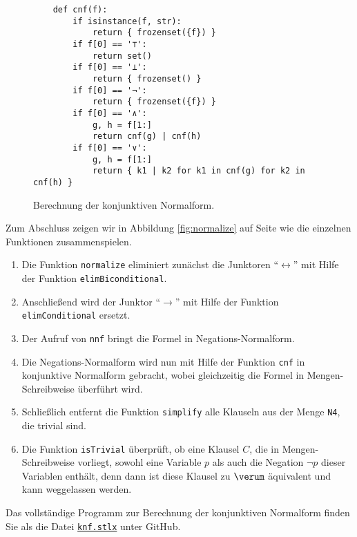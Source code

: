 \begin{figure}[!ht]
  \centering
\begin{verbatim}
    def cnf(f):
        if isinstance(f, str): 
            return { frozenset({f}) }
        if f[0] == '⊤':
            return set()
        if f[0] == '⊥':
            return { frozenset() }
        if f[0] == '¬':
            return { frozenset({f}) }
        if f[0] == '∧':
            g, h = f[1:]
            return cnf(g) | cnf(h)
        if f[0] == '∨':
            g, h = f[1:]
            return { k1 | k2 for k1 in cnf(g) for k2 in cnf(h) }
\end{verbatim}
\vspace*{-0.3cm}
  \caption{Berechnung der konjunktiven Normalform. }
  \label{fig:cnf}
\end{figure}

Zum Abschluss zeigen wir in Abbildung \ref{fig:normalize} auf Seite \pageref{fig:normalize}
wie die einzelnen Funktionen zusammenspielen.
\begin{enumerate}
\item Die Funktion \texttt{normalize} eliminiert zunächst die Junktoren ``$\leftrightarrow$''
      mit Hilfe der Funktion \texttt{elimBiconditional}.
\item Anschließend wird der Junktor  ``$\rightarrow$'' mit Hilfe der Funktion \texttt{elimConditional}
      ersetzt.      
\item Der Aufruf von \texttt{nnf} bringt die Formel in Negations-Normalform.
\item Die Negations-Normalform wird nun mit Hilfe der Funktion \texttt{cnf} in konjunktive Normalform gebracht,
      wobei gleichzeitig die Formel in Mengen-Schreibweise überführt wird.  
\item Schließlich entfernt die Funktion \texttt{simplify} alle Klauseln aus der Menge \texttt{N4}, die trivial
      sind.
\item Die Funktion \texttt{isTrivial} überprüft, ob eine Klausel $C$, die in Mengen-Schreibweise vorliegt,
      sowohl eine Variable $p$ als auch die Negation $\neg p$ dieser Variablen enthält, denn dann ist diese
      Klausel zu $\verum$ äquivalent und kann weggelassen werden.
\end{enumerate}
Das vollständige Programm zur Berechnung der konjunktiven Normalform finden Sie als die Datei
\href{https://github.com/karlstroetmann/Logic/blob/master/SetlX/knf.stlx}{\texttt{knf.stlx}} 
unter GitHub.

